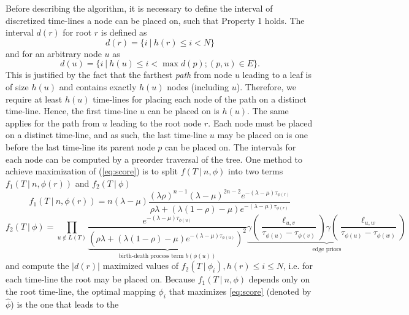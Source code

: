 \documentclass{llncs}
\begin{document}
Before describing the algorithm, it is necessary to define the interval of
discretized time-lines a node can be placed on, such that Property 1 holds. The
interval $d(r)$ for root $r$ is defined as $$d(r) = \{ i\ |\ h(r) \leq i <
N\}$$ and for an arbitrary node $u$ as $$d(u) = \{ i\ |\ h(u) \leq i < \max
d(p); (p,u) \in E\}.$$ This is justified by the fact that the farthest {\em
path} from node $u$ leading to a leaf is of size $h(u)$ and contains exactly
$h(u)$ nodes (including $u$).  Therefore, we require at least $h(u)$ time-lines
for placing each node of the path on a distinct time-line.  Hence, the first
time-line $u$ can be placed on is $h(u)$. The same applies for the path from
$u$ leading to the root node $r$.  Each node must be placed on a distinct
time-line, and as such, the last time-line $u$ may be placed on is one before
the last time-line its parent node $p$ can be placed on. The intervals for each
node can be computed by a preorder traversal of the tree. One method to achieve
maximization of (\ref{eq:score}) is to split $f(T\ |\ n, \phi)$ into two terms
$f_1(T\ |\ n,\phi(r))$ and $f_2(T\ |\ \phi)$
%
%
\begin{equation}\label{eq:part1} 
f_1(T\ |\ n,\phi(r)) = n (\lambda-\mu)
                       \frac{(\lambda\rho)^{n-1}%
                             (\lambda-\mu)^{2n-2}%
                             e^{-(\lambda-\mu)\tau_{\phi(r)}}}%
                            {\rho\lambda +%
                             (\lambda(1 -\rho)-\mu)%
                             e^{-(\lambda-\mu)\tau_{\phi(r)}}}
\end{equation}
%
%
\begin{equation}\label{eq:part2}
f_2(T\ |\ \phi) = \prod_{u\notin L(T)}
                  \underbrace{
                    \frac{e^{-(\lambda-\mu)\tau_{\phi(u)}}}
                         {(\rho\lambda + 
                          (\lambda(1-\rho)-\mu)
                          e^{-(\lambda-\mu)\tau_{\phi(u)}})^2}
                  }_{\textrm{birth-death process term } b(\phi(u))}
                  \underbrace{
                    \gamma(\frac{\ell_{u,v}}{\tau_{\phi(u)}-\tau_{\phi(v)}})
                    \gamma(\frac{\ell_{u,w}}{\tau_{\phi(u)}-\tau_{\phi(w)}})
                  }_{\textrm{edge priors}}
\end{equation}
%
%
and compute the $|d(r)|$ maximized values of $f_2(T\ |\ \phi_i), h(r) \leq i
\leq N$, i.e. for each time-line the root may be placed on. Because $f_1(T\ |\
n,\phi)$ depends only on the root time-line, the optimal mapping $\phi_i$ that
maximizes \ref{eq:score} (denoted by $\hat\phi$) is the one that leads to the
\end{document}
